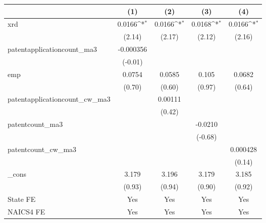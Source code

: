 {
\def\sym#1{\ifmmode^{#1}\else\(^{#1}\)\fi}
\begin{tabular}{l*{4}{c}}
\hline\hline
            &\multicolumn{1}{c}{(1)}         &\multicolumn{1}{c}{(2)}         &\multicolumn{1}{c}{(3)}         &\multicolumn{1}{c}{(4)}         \\
\hline
xrd         &      0.0166\sym{*}  &      0.0166\sym{*}  &      0.0168\sym{*}  &      0.0166\sym{*}  \\
            &      (2.14)         &      (2.17)         &      (2.12)         &      (2.16)         \\
[1em]
patentapplicationcount\_ma3&   -0.000356         &                     &                     &                     \\
            &     (-0.01)         &                     &                     &                     \\
[1em]
emp         &      0.0754         &      0.0585         &       0.105         &      0.0682         \\
            &      (0.70)         &      (0.60)         &      (0.97)         &      (0.64)         \\
[1em]
patentapplicationcount\_cw\_ma3&                     &     0.00111         &                     &                     \\
            &                     &      (0.42)         &                     &                     \\
[1em]
patentcount\_ma3&                     &                     &     -0.0210         &                     \\
            &                     &                     &     (-0.68)         &                     \\
[1em]
patentcount\_cw\_ma3&                     &                     &                     &    0.000428         \\
            &                     &                     &                     &      (0.14)         \\
[1em]
\_cons      &       3.179         &       3.196         &       3.179         &       3.185         \\
            &      (0.93)         &      (0.94)         &      (0.90)         &      (0.92)         \\
[1em]
State FE    &         Yes         &         Yes         &         Yes         &         Yes         \\
[1em]
NAICS4 FE   &         Yes         &         Yes         &         Yes         &         Yes         \\

\end{tabular}}
